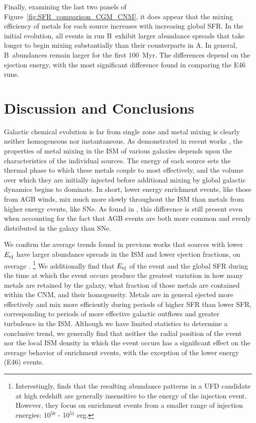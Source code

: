 \documentclass[twocolumn]{aastex62}
\newcommand{\runonenu}{A}
\newcommand{\runtwonu}{B}
\begin{document}
Finally, examining the last two panels of Figure~\ref{fig:SFR_comparison_CGM_CNM}, it does appear that the mixing efficiency of metals for each source increases with increasing global SFR. In the initial evolution, all events in run \runtwonu~exhibit larger abundance spreads that take longer to begin mixing substantially than their counterparts in \runonenu. In general, \runtwonu~abundances remain larger for the first 100~Myr. The differences depend on the ejection energy, with the most significant difference found in comparing the E46 runs.

\section{Discussion and Conclusions}
\label{sec:discussion conclusion}

Galactic chemical evolution is far from single zone and metal mixing is clearly neither homogeneous nor instantaneous. As demonstrated in recent works \citep{Safarzadeh2017,Emerick2018b,KrumholzTing2018}, the properties of metal mixing in the ISM of various galaxies depends upon the characteristics of the individual sources. The energy of each source sets the thermal phase to which these metals couple to most effectively, and the volume over which they are initially injected before additional mixing by global galactic dynamics begins to dominate. In short, lower energy enrichment events, like those from AGB winds, mix much more slowly throughout the ISM than metals from higher energy events, like SNe. As found in \cite{Emerick2018b},
this difference is still present even when accounting for the fact that AGB events are both more common and evenly distributed in the galaxy than SNe.

We confirm the average trends found in previous works that sources with lower $E_{\rm ej}$ have larger abundance spreads in the ISM and lower ejection fractions, on average \citep{KrumholzTing2018,Emerick2018b}.%
\footnote{Interestingly, \cite{Safarzadeh2017} finds that the resulting abundance patterns in a UFD candidate at high redshift are generally insensitive to the energy of the injection event. However, they focus on enrichment events from a smaller range of injection energies: 10$^{50}$ - 10$^{51}$ erg.}
We additionally find that $E_{\rm ej}$ of the event and the global SFR during the time at which the event occurs produce the greatest variation in how many metals are retained by the galaxy, what fraction of those metals are contained within the CNM, and their homogeneity. Metals are in general ejected more effectively and mix more efficiently during periods of higher SFR than lower SFR, corresponding to periods of more effective galactic outflows and greater turbulence in the ISM. Although we have limited statistics to determine a conclusive trend, we generally find that neither the radial position of the event nor the local ISM density in which the event occurs has a significant effect on the average behavior of enrichment events, with the exception of the lower energy (E46) events.
\end{document}
